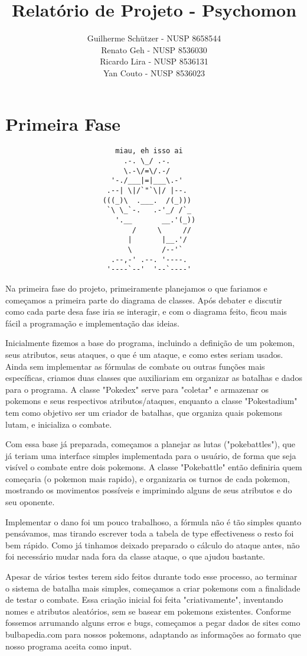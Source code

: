 \documentclass[a4paper]{article}
\title{Relatório de Projeto - Psychomon}
\author{
Guilherme Schützer - NUSP 8658544 \\
Renato Geh         - NUSP 8536030 \\
Ricardo Lira       - NUSP 8536131 \\
Yan Couto          - NUSP 8536023
}
\date{}
\begin{document}
\maketitle


\section{Primeira Fase}

\begin{verbatim}
                          miau, eh isso ai
                            .-. \_/ .-.
                            \.-\/=\/.-/
                         '-./___|=|___\.-'
                        .--| \|/`"`\|/ |--.
                       (((_)\  .___.  /(_)))
                        `\ \_`-.   .-'_/ /`_
                          '.__       __.'(_))
                              /     \     //
                             |       |__.'/
                             \       /--'`
                         .--,-' .--. '----.
                        '----`--'  '--`----'
\end{verbatim}

 Na primeira fase do projeto, primeiramente planejamos o que fariamos e
começamos a primeira parte do diagrama de classes. Após debater e discutir como
cada parte desa fase iria se interagir, e com o diagrama feito, ficou mais fácil
a programação e implementação das ideias.

    Inicialmente fizemos a base do programa, incluindo a definição de um
pokemon, seus atributos, seus ataques, o que é um ataque, e como estes
seriam usados. Ainda sem implementar as fórmulas de combate ou outras funções
mais específicas, criamos duas classes que auxiliariam em organizar as
batalhas e dados para o programa. A classe "Pokedex" serve para "coletar" e
armazenar os pokemons e seus respectivos atributos/ataques, enquanto a classe
"Pokestadium" tem como objetivo ser um criador de batalhas, que organiza quais
pokemons lutam, e inicializa o combate.

    Com essa base já preparada, começamos a planejar as lutas ("pokebattles"),
que já teriam uma interface simples implementada para o usuário, de forma que
seja visível o combate entre dois pokemons. A classe "Pokebattle" então
definiria quem começaria (o pokemon mais rapido), e organizaria os turnos de
cada pokemon, mostrando os movimentos possíveis e imprimindo alguns de seus
atributos e do seu oponente.

    Implementar o dano foi um pouco trabalhoso, a fórmula não é tão simples
quanto pensávamos, mas tirando escrever toda a tabela de type effectiveness 
o resto foi bem rápido. Como já tinhamos deixado preparado o cálculo do ataque
antes, não foi necessário mudar nada fora da classe ataque, o que ajudou bastante.

    Apesar de vários testes terem sido feitos durante todo esse processo, ao
terminar o sistema de batalha mais simples, começamos a criar pokemons com a
finalidade de testar o combate. Essa criação inicial foi feita "criativamente",
inventando nomes e atributos aleatórios, sem se basear em pokemons existentes.
Conforme fossemos arrumando alguns erros e bugs, começamos a pegar dados de
sites como bulbapedia.com para nossos pokemons, adaptando as informações ao
formato que nosso programa aceita como input.
\end{document}
